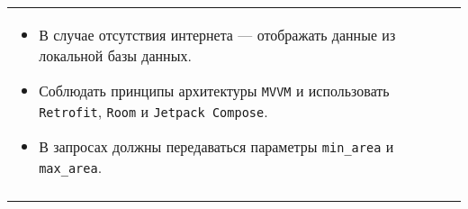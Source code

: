 \documentclass[a4paper]{article}
\begin{document}
\begin{tabular}{!{\vrule width 2pt}p{5cm}|p{6cm}|p{4cm}!{\vrule width 2pt}}
{\begin{minipage}{16cm}
\begin{enumerate}
\begin{itemize}
  \item В случае отсутствия интернета — отображать данные из локальной базы данных.
  \item Соблюдать принципы архитектуры \texttt{MVVM} и использовать \texttt{Retrofit}, \texttt{Room} и \texttt{Jetpack Compose}.
  \item В запросах должны передаваться параметры \texttt{min\_area} и \texttt{max\_area}.
\end{itemize} 
\end{enumerate}

\vspace{0.2cm}
    
\end{minipage}
}
\\
\end{tabular}

\newpage
\end{document}
